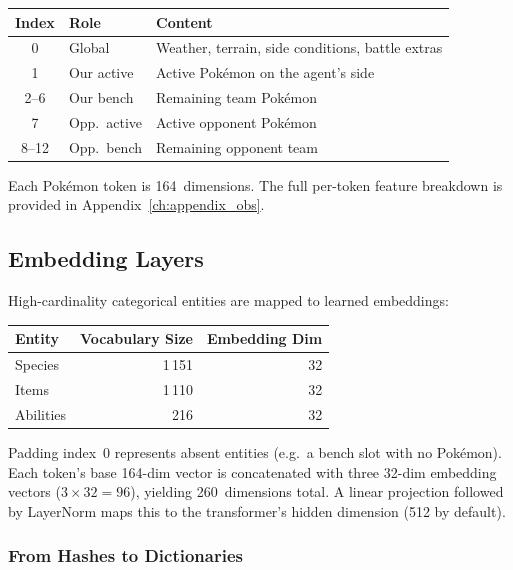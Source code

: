 \begin{center}
\small
\begin{tabularx}{0.7\textwidth}{c l l}
  \toprule
  \textbf{Index} & \textbf{Role} & \textbf{Content} \\
  \midrule
  0        & Global      & Weather, terrain, side conditions, battle extras \\
  1        & Our active  & Active Pok\'{e}mon on the agent's side \\
  2--6     & Our bench   & Remaining team Pok\'{e}mon \\
  7        & Opp.\ active & Active opponent Pok\'{e}mon \\
  8--12    & Opp.\ bench  & Remaining opponent team \\
  \bottomrule
\end{tabularx}
\end{center}

Each Pok\'{e}mon token is 164~dimensions.  The full per-token feature
breakdown is provided in Appendix~\ref{ch:appendix_obs}.

\subsection{Embedding Layers}

High-cardinality categorical entities are mapped to learned embeddings:

\begin{center}
\small
\begin{tabularx}{0.7\textwidth}{l r r}
  \toprule
  \textbf{Entity} & \textbf{Vocabulary Size} & \textbf{Embedding Dim} \\
  \midrule
  Species   & 1\,151 & 32 \\
  Items     & 1\,110 & 32 \\
  Abilities & 216    & 32 \\
  \bottomrule
\end{tabularx}
\end{center}

Padding index~0 represents absent entities (e.g.\ a bench slot with no
Pok\'{e}mon).  Each token's base 164-dim vector is concatenated with three
32-dim embedding vectors ($3 \times 32 = 96$), yielding 260~dimensions total.
A linear projection followed by LayerNorm maps this to the transformer's hidden
dimension (512 by default).

\subsubsection{From Hashes to Dictionaries}

